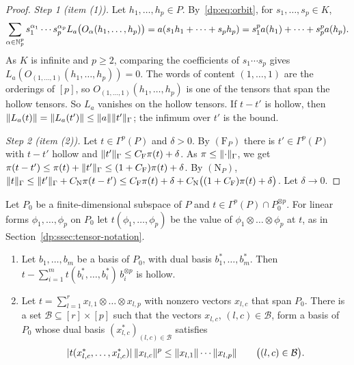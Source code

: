 \begin{proof}
\emph{Step 1 (item (1)).} Let $h_1,\dots,h_p\in P$. By~\eqref{dp:eq:orbit}, for $s_1,\dots,s_p\in K$,
\[
 \sum_{\alpha\in\mathbb N^p_p}s_1^{\alpha_1}\cdots s_p^{\alpha_p}L_a\bigl(O_\alpha(h_1,\dots,h_p)\bigr)
 =a(s_1h_1+\dots+s_ph_p)=s_1^pa(h_1)+\dots+s_p^pa(h_p).
\]
As $K$ is infinite and $p\ge2$, comparing the coefficients of $s_1\cdots s_p$ gives $L_a(O_{(1,\dots,1)}(h_1,\dots,h_p))=0$. The words of content $(1,\dots,1)$ are the orderings of $[p]$, so $O_{(1,\dots,1)}(h_1,\dots,h_p)$ is one of the tensors that span the hollow tensors. So $L_a$ vanishes on the hollow tensors. If $t-t'$ is hollow, then $\lVert L_a(t)\rVert=\lVert L_a(t')\rVert\le\lVert a\rVert\lVert t'\rVert_\Gamma$; the infimum over $t'$ is the bound.

\emph{Step 2 (item (2)).} Let $t\in\Gamma^p(P)$ and $\delta>0$. By $(\mathrm F_P)$ there is $t'\in\Gamma^p(P)$ with $t-t'$ hollow and $\lVert t'\rVert_\Gamma\le C_{\mathrm F}\pi(t)+\delta$. As $\pi\le\lVert \cdot\rVert_\Gamma$, we get $\pi(t-t')\le\pi(t)+\lVert t'\rVert_\Gamma\le(1+C_{\mathrm F})\pi(t)+\delta$. By $(\mathrm N_P)$, $\lVert t\rVert_\Gamma\le\lVert t'\rVert_\Gamma+C_{\mathrm N}\pi(t-t')\le C_{\mathrm F}\pi(t)+\delta+C_{\mathrm N}\bigl((1+C_{\mathrm F})\pi(t)+\delta\bigr)$. Let $\delta\to0$.
\end{proof}

\begin{lemma}\label{dp:lem:bases}
Let $P_0$ be a finite-dimensional subspace of $P$ and $t\in\Gamma^p(P)\cap P_0^{\otimes p}$. For linear forms $\phi_1,\dots,\phi_p$ on $P_0$ let $t(\phi_1,\dots,\phi_p)$ be the value of $\phi_1\otimes\dots\otimes\phi_p$ at $t$, as in Section~\ref{dp:ssec:tensor-notation}.
\begin{enumerate}
\item Let $b_1,\dots,b_m$ be a basis of $P_0$, with dual basis $b_1^*,\dots,b_m^*$. Then $t-\sum_{i=1}^mt(b_i^*,\dots,b_i^*)\,b_i^{\otimes p}$ is hollow.
\item Let $t=\sum_{l=1}^rx_{l,1}\otimes\dots\otimes x_{l,p}$ with nonzero vectors $x_{l,c}$ that span $P_0$. There is a set $\mathcal B\subseteq[r]\times[p]$ such that the vectors $x_{l,c}$, $(l,c)\in\mathcal B$, form a basis of $P_0$ whose dual basis $(x_{l,c}^*)_{(l,c)\in\mathcal B}$ satisfies
\[
 \lvert t(x_{l,c}^*,\dots,x_{l,c}^*)\rvert\,\lVert x_{l,c}\rVert^p\le\lVert x_{l,1}\rVert\cdots\lVert x_{l,p}\rVert\qquad\bigl((l,c)\in\mathcal B\bigr).
\]
\end{enumerate}
\end{lemma}


